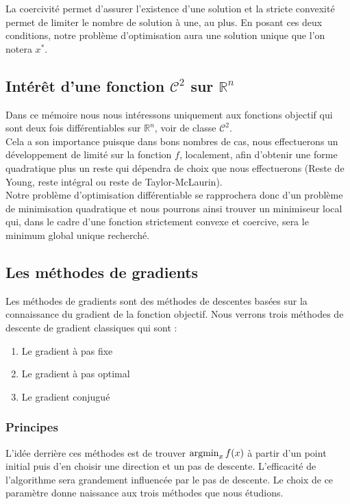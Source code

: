 La coercivité permet d'assurer l'existence d'une solution et la stricte convexité permet de limiter le nombre de solution à une, au plus. En posant ces deux conditions, notre problème d'optimisation aura une solution unique que l'on notera $x^*$.

\subsection{Intérêt d'une fonction $\mathcal{C}^2$ sur $\mathbb{R}^n$}
Dans ce mémoire nous nous intéressons uniquement aux fonctions objectif qui sont deux fois différentiables sur $\mathbb{R}^n$, voir de classe $\mathcal{C}^2$. \\

Cela a son importance puisque dans bons nombres de cas, nous effectuerons un développement de limité sur la fonction $f$, localement, afin d'obtenir une forme quadratique plus un reste qui dépendra de choix que nous effectuerons (Reste de Young, reste intégral ou reste de Taylor-McLaurin). \\

Notre problème d'optimisation différentiable se rapprochera donc d'un problème de minimisation quadratique et nous pourrons ainsi trouver un minimiseur local qui, dans le cadre d'une fonction strictement convexe et coercive, sera le minimum global unique recherché.
\subsection{Les méthodes de gradients}
Les méthodes de gradients sont des méthodes de descentes basées sur la connaissance du gradient de la fonction objectif. Nous verrons trois méthodes de descente de gradient classiques qui sont :
\begin{enumerate}
	\item Le gradient à pas fixe
	\item Le gradient à pas optimal
	\item Le gradient conjugué
\end{enumerate}
\subsubsection{Principes}
L'idée derrière ces méthodes est de trouver $\argmin_x f(x)$ à partir d'un point initial puis d'en choisir une direction et un pas de descente. L'efficacité de l'algorithme sera grandement influencée par le pas de descente. Le choix de ce paramètre donne naissance aux trois méthodes que nous étudions.
